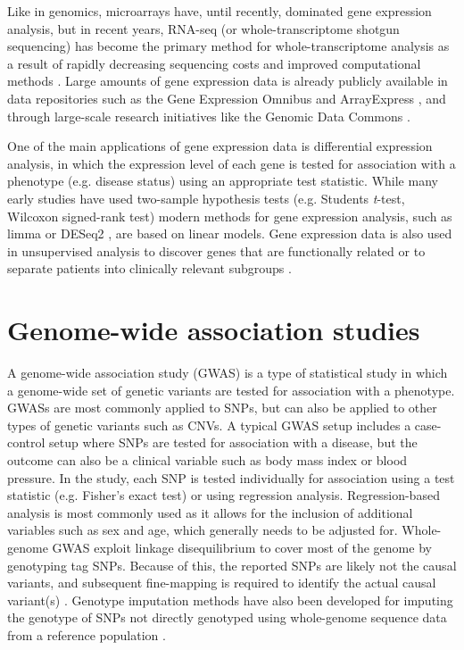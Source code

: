 Like in genomics, microarrays have, until recently, dominated gene expression analysis, but in recent years, RNA-seq (or whole-transcriptome shotgun sequencing) has become the primary method for whole-transcriptome analysis as a result of rapidly decreasing sequencing costs and improved computational methods \cite{Wang2018}. Large amounts of gene expression data is already publicly available in data repositories such as the Gene Expression Omnibus \cite{Barrett2012} and ArrayExpress \cite{Athar2018}, and through large-scale research initiatives like the Genomic Data Commons \cite{Gao2019}.

One of the main applications of gene expression data is differential expression analysis, in which the expression level of each gene is tested for association with a phenotype (e.g. disease status) using an appropriate test statistic. While many early studies have used two-sample hypothesis tests (e.g. Students \textit{t}-test, Wilcoxon signed-rank test) modern methods for gene expression analysis, such as limma \cite{Ritchie2015} or DESeq2 \cite{Love2014}, are based on linear models. Gene expression data is also used in unsupervised analysis to discover genes that are functionally related  \cite{Stuart2003} or to separate patients into clinically relevant subgroups \cite{Perou2000,Parker2009,Wilkerson2010,Bailey2016}.


\section{Genome-wide association studies}
\label{sec:gwas}
A genome-wide association study (GWAS) is a type of statistical study in which a genome-wide set of genetic variants are tested for association with a phenotype. GWASs are most commonly applied to SNPs, but can also be applied to other types of genetic variants such as CNVs. A typical GWAS setup includes a case-control setup where SNPs are tested for association with a disease, but the outcome can also be a clinical variable such as body mass index or blood pressure.
In the study, each SNP is tested individually for association using a test statistic (e.g. Fisher's exact test) or using regression analysis. Regression-based analysis is most commonly used as it allows for the inclusion of additional variables such as sex and age, which generally needs to be adjusted for.
Whole-genome GWAS exploit linkage disequilibrium to cover most of the genome by genotyping tag SNPs. Because of this, the reported SNPs are likely not the causal variants, and subsequent fine-mapping is required to identify the actual causal variant(s) \cite{Spain2015}. Genotype imputation methods have also been developed for imputing the genotype of SNPs not directly genotyped using whole-genome sequence data from a reference population \cite{Browning2007,Li2009,Howie2009}.

